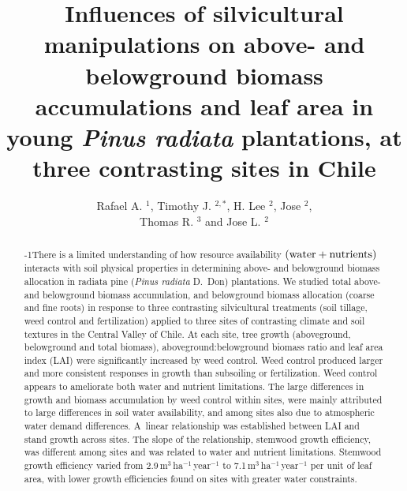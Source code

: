 \documentclass[final]{foresj}
\begin{document}
\title{Influences of silvicultural manipulations on above- and belowground biomass accumulations and leaf area in young \textit{Pinus radiata} plantations, at three contrasting sites in Chile}

\author[Influences of silvicultural manipulations]{Rafael A. $^{1}$, Timothy J. $^{2,\ast}$, H. Lee $^{2}$, Jose $^{2}$,\\ Thomas R. $^{3}$ and Jose L. $^{2}$}

\address{$^{1}$Facultad de Ciencias Forestales Universidad de Concepci\'{o}n, Cooperativa de Productividad Forestal, Casilla 160-C, Correo~3,\\ Concepci\'{o}n,~Chile\\
$^{2}$Department of Forestry and Environmental Resources, North Carolina State University, Jordan Hall 3108, Box 8008,\\ Raleigh, NC~27695-8008, USA\\
$^{3}$Department of Forest Resources and Environmental Conservation, Virginia Polytechnic Institute and State University, 228~Cheatham~Hall, Blacksburg, VA 24060, USA}


\date{}

\begin{abstract}
\looseness-1There is a limited understanding of how resource availability $(\hbox{water}+\hbox{nutrients})$ interacts with soil physical properties in determining above- and
belowground biomass allocation in radiata pine (\textit{Pinus radiata} D.~Don) plantations. We
studied total above- and belowground biomass accumulation, and belowground
biomass allocation (coarse and fine roots) in response to three contrasting
silvicultural treatments (soil tillage, weed control and fertilization)
applied to three sites of contrasting climate and soil textures in the
Central Valley of Chile. At each site, tree growth (aboveground, belowground
and total biomass), aboveground:belowground biomass ratio and leaf area
index (LAI) were significantly increased by weed control. Weed control
produced larger and more consistent responses in growth than subsoiling or
fertilization. Weed control appears to ameliorate both water and nutrient
limitations. The large differences in growth and biomass accumulation by
weed control within sites, were mainly attributed to large differences in
soil water availability, and among sites also due to atmospheric water
demand differences. A~linear relationship was established between LAI and
stand growth across sites. The slope of the relationship, stemwood growth
efficiency, was different among sites and was related to water and nutrient
limitations. Stemwood growth efficiency varied from 2.9\,m$^{3}$\,ha$^{-1}$\,year$^{-1}$ to 7.1\,m$^{3}$\,ha$^{-1}$\,year$^{-1}$ per unit of leaf area, with lower
growth efficiencies found on sites with greater water constraints.\vskip1pt
\end{abstract}
\end{document}
